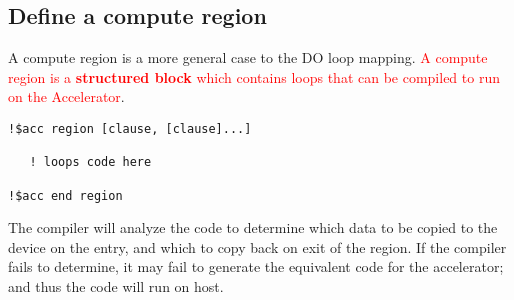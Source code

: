 \subsection{Define a compute region}
\label{sec:define-region}

A compute region is a more general case to the DO loop
mapping.
\textcolor{red}{A compute region is a {\bf structured block} which
  contains loops that can be compiled to run on the Accelerator}.

\begin{lstlisting}
!$acc region [clause, [clause]...]
   
   ! loops code here
   
!$acc end region
\end{lstlisting}

The compiler will analyze the code to determine which data to be
copied to the device on the entry, and which to copy back on exit of
the region. If the compiler fails to determine, it may fail to
generate the equivalent code for the accelerator; and thus the code
will run on host.

